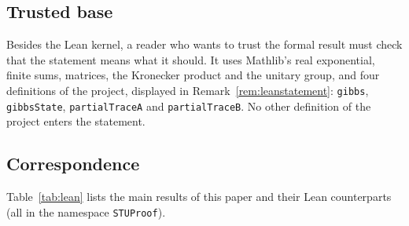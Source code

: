 \documentclass[11pt]{amsart}
\theoremstyle{definition}
\theoremstyle{remark}
\numberwithin{equation}{section}
\newcommand{\lean}[1]{\texttt{#1}}
\begin{document}
\subsection{Trusted base}
Besides the Lean kernel, a reader who wants to trust the formal result must check that the statement
means what it should. It uses Mathlib's real exponential, finite sums, matrices, the Kronecker product
and the unitary group, and four definitions of the project, displayed in
Remark~\ref{rem:leanstatement}: \lean{gibbs}, \lean{gibbsState}, \lean{partialTraceA} and
\lean{partialTraceB}. No other definition of the project enters the statement.

\subsection{Correspondence}
Table~\ref{tab:lean} lists the main results of this paper and their Lean counterparts (all in the
namespace \lean{STUProof}).
\end{document}
